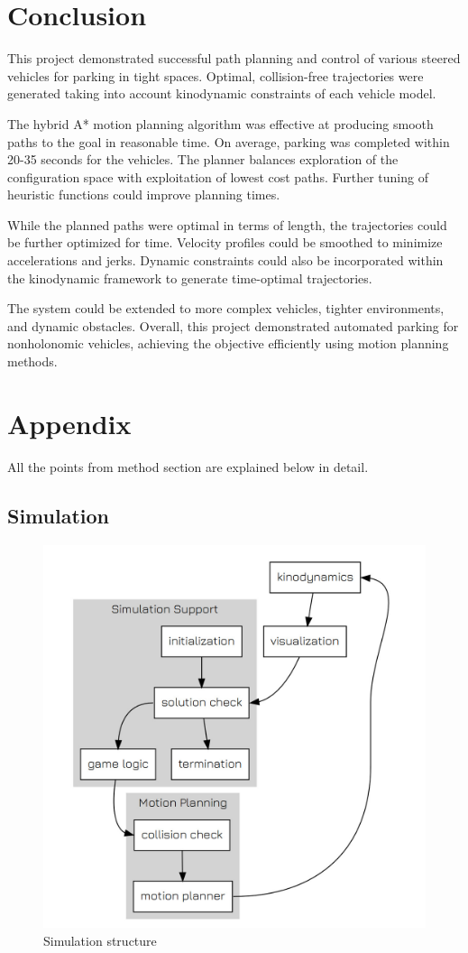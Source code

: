 \documentclass[12pt,a4paper]{article}
\begin{document}
\section{Conclusion}\label{sec:discussion}

This project demonstrated successful path planning and control of various steered vehicles for parking in tight spaces. Optimal, collision-free trajectories were generated taking into account kinodynamic constraints of each vehicle model.

The hybrid A* motion planning algorithm was effective at producing smooth paths to the goal in reasonable time. On average, parking was completed within 20-35 seconds for the vehicles. The planner balances exploration of the configuration space with exploitation of lowest cost paths. Further tuning of heuristic functions could improve planning times.

While the planned paths were optimal in terms of length, the trajectories could be further optimized for time. Velocity profiles could be smoothed to minimize accelerations and jerks. Dynamic constraints could also be incorporated within the kinodynamic framework to generate time-optimal trajectories.

The system could be extended to more complex vehicles, tighter environments, and dynamic obstacles. Overall, this project demonstrated automated parking for nonholonomic vehicles, achieving the objective efficiently using motion planning methods.





\section{Appendix}\label{sec:discussion}

All the points from method section are explained below in detail. 

\subsection{Simulation}\label{sec:Simulation}

\begin{figure}[htbp!]
\begin{center}
\includegraphics[width=0.5\columnwidth]{images/simulation_flowchart.jpeg}
\end{center}
\caption{Simulation structure}
\label{fig:simulation_flowchart}
\end{figure}
\end{document}
